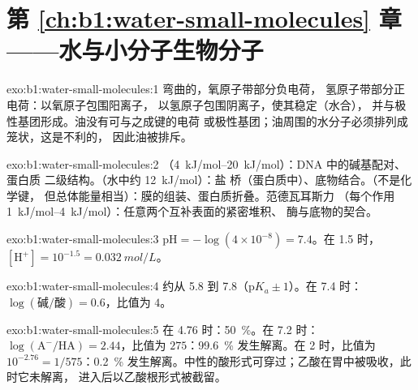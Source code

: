 \section*{第 \ref{ch:b1:water-small-molecules} 章——水与小分子生物分子}

\begin{solution}{exo:b1:water-small-molecules:1}
弯曲的，氧原子带部分负电荷，
氢原子带部分正电荷：以氧原子包围阳离子，
以氢原子包围阴离子，使其稳定（水合），
并与极性基团形成。油没有可与之成键的电荷
或极性基团；油周围的水分子必须排列成笼状，这是不利的，
因此油被排斥。
\end{solution}

\begin{solution}{exo:b1:water-small-molecules:2}
（\qtyrange{4}{20}{kJ/mol}）：DNA 中的碱基配对、蛋白质
二级结构。（水中约 \qty{12}{kJ/mol}）：盐
桥（蛋白质中）、底物结合。（不是化学键，
但总体能量相当）：膜的组装、蛋白质折叠。范德瓦耳斯力
（每个作用 \qtyrange{1}{4}{kJ/mol}）：任意两个互补表面的紧密堆积、
酶与底物的契合。
\end{solution}

\begin{solution}{exo:b1:water-small-molecules:3}
$\mathrm{pH} = -\log(4\times 10^{-8}) = 7.4$。在  1.5 时，
$[\mathrm{H^+}] = 10^{-1.5} = \qty{0.032}{mol/L}$。
\end{solution}

\begin{solution}{exo:b1:water-small-molecules:4}
约从 5.8 到 7.8（p$K_a \pm 1$）。在 7.4 时：$\log(\text{碱}/\text{酸})
= 0.6$，比值为 $4$。
\end{solution}

\begin{solution}{exo:b1:water-small-molecules:5}
在  4.76 时：\qty{50}{\%}。在 7.2 时：$\log(\mathrm{A^-}/\mathrm{HA}) =
2.44$，比值为 $275$：\qty{99.6}{\%} 发生解离。在  2 时，比值为 $10^{-2.76} =
1/575$：\qty{0.2}{\%} 发生解离。中性的酸形式可穿过；乙酸在胃中被吸收，此时它未解离，
进入后以乙酸根形式被截留。
\end{solution}

